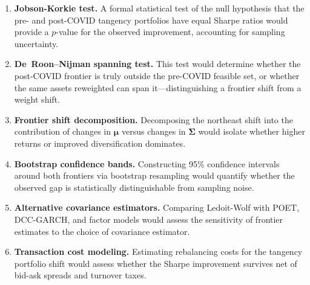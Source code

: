 \documentclass[12pt,a4paper]{article}
\begin{document}
\begin{enumerate}
    \item \textbf{Jobson-Korkie test.} A formal statistical test of the null hypothesis
        that the pre- and post-COVID tangency portfolios have equal Sharpe ratios would
        provide a $p$-value for the observed improvement, accounting for sampling
        uncertainty.
    \item \textbf{De~Roon--Nijman spanning test.} This test would determine whether the
        post-COVID frontier is truly outside the pre-COVID feasible set, or whether the
        same assets reweighted can span it---distinguishing a frontier shift from a
        weight shift.
    \item \textbf{Frontier shift decomposition.} Decomposing the northeast shift into
        the contribution of changes in $\boldsymbol{\mu}$ versus changes in
        $\boldsymbol{\Sigma}$ would isolate whether higher returns or improved
        diversification dominates.
    \item \textbf{Bootstrap confidence bands.} Constructing 95\% confidence intervals
        around both frontiers via bootstrap resampling would quantify whether the
        observed gap is statistically distinguishable from sampling noise.
    \item \textbf{Alternative covariance estimators.} Comparing Ledoit-Wolf with POET,
        DCC-GARCH, and factor models would assess the sensitivity of frontier estimates
        to the choice of covariance estimator.
    \item \textbf{Transaction cost modeling.} Estimating rebalancing costs for the
        tangency portfolio shift would assess whether the Sharpe improvement survives
        net of bid-ask spreads and turnover taxes.
\end{enumerate}
\end{document}
